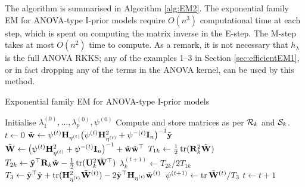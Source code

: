 The algorithm is summarised in Algorithm \ref{alg:EM2}.
The exponential family EM for ANOVA-type I-prior models require $O(n^3)$ computational time at each step, which is spent on computing the matrix inverse in the E-step.
The M-step takes at most $O(n^2)$ time to compute.
As a remark, it is not necessary that $h_\lambda$ is the full ANOVA RKKS; any of the examples 1--3 in Section \ref{sec:efficientEM1}, or in fact dropping any of the terms in the ANOVA kernel, can be used by this method.

\begin{algorithm}[hbt]
\caption{Exponential family EM for ANOVA-type I-prior models}\label{alg:EM2}
\begin{algorithmic}[1]
    \State Initialise $\lambda_1^{(0)},\dots,\lambda_p^{(0)}, \psi^{(0)}$
    \State Compute and store matrices as per ${\mathcal R}_k$ and ${\mathcal S}_k$.
    \State $t \gets 0$
  \EndProcedure 
  \Statex
      \State $\tilde{\mathbf w} \gets \psi^{(t)} {\mathbf H}_{\eta^{(t)}} \big(\psi^{(t)} {\mathbf H}_{\eta^{(t)}}^2 + \psi^{-(t)}{\mathbf I}_n \big)^{-1} \tilde{{\mathbf y}}$
      \State $\tilde{\mathbf W} \gets \big(\psi^{(t)} {\mathbf H}_{\eta^{(t)}}^2 + \psi^{-(t)}{\mathbf I}_n \big)^{-1} + \tilde{\mathbf w}\tilde{\mathbf w}^{\top}$
    \EndProcedure
    \Statex
        \State $T_{1k} \gets \frac{1}{2} \operatorname{tr}({\mathbf R}_k^2 \tilde{\mathbf W})$
        \State $T_{2k} \gets \tilde{{\mathbf y}}^\top {\mathbf R}_k \tilde{\mathbf w} - \frac{1}{2} \operatorname{tr}({\mathbf U}_k^2 \tilde{\mathbf W}^\top)$
        \State $\lambda_k^{(t+1)} \gets T_{2k} / 2T_{1k}$
      \EndFor
      \State $T_3 \gets \tilde{{\mathbf y}}^\top\tilde{{\mathbf y}} + \operatorname{tr}({\mathbf H}_{\eta^{(t)}}^2\tilde{\mathbf W}^{(t)}) - 2\tilde{{\mathbf y}}^\top{\mathbf H}_{\eta^{(t)}}\tilde{\mathbf w}^{(t)}$
      \State $\psi^{(t+1)} \gets \operatorname{tr} \tilde{\mathbf W}^{(t)} / T_3$
    \EndProcedure
    \State $t \gets t+1$
  \EndWhile
\end{algorithmic}
\end{algorithm}


